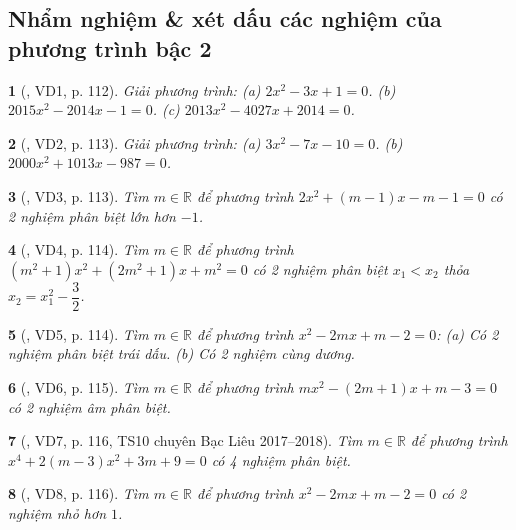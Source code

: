 \documentclass{article}
\newtheorem{baitoan}{}
\begin{document}
\subsection{Nhẩm nghiệm \& xét dấu các nghiệm của phương trình bậc 2}

\begin{baitoan}[\cite{Thu_Viet_Minh_ptb2}, VD1, p. 112]
	Giải phương trình: (a) $2x^2 - 3x + 1 = 0$. (b) $2015x^2 - 2014x - 1 = 0$. (c) $2013x^2 - 4027x + 2014 = 0$.
\end{baitoan}

\begin{baitoan}[\cite{Thu_Viet_Minh_ptb2}, VD2, p. 113]
	Giải phương trình: (a) $3x^2 - 7x - 10 = 0$. (b) $2000x^2 + 1013x - 987 = 0$.
\end{baitoan}

\begin{baitoan}[\cite{Thu_Viet_Minh_ptb2}, VD3, p. 113]
	Tìm $m\in\mathbb{R}$ để phương trình $2x^2 + (m - 1)x - m - 1 = 0$ có 2 nghiệm phân biệt lớn hơn $-1$.
\end{baitoan}

\begin{baitoan}[\cite{Thu_Viet_Minh_ptb2}, VD4, p. 114]
	Tìm $m\in\mathbb{R}$ để phương trình $(m^2 + 1)x^2 + (2m^2 + 1)x + m^2 = 0$ có 2 nghiệm phân biệt $x_1 < x_2$ thỏa $x_2 = x_1^2 - \dfrac{3}{2}$.
\end{baitoan}

\begin{baitoan}[\cite{Thu_Viet_Minh_ptb2}, VD5, p. 114]
	Tìm $m\in\mathbb{R}$ để phương trình $x^2 - 2mx + m - 2 = 0$: (a) Có 2 nghiệm phân biệt trái dấu. (b) Có 2 nghiệm cùng dương.
\end{baitoan}

\begin{baitoan}[\cite{Thu_Viet_Minh_ptb2}, VD6, p. 115]
	Tìm $m\in\mathbb{R}$ để phương trình $mx^2 - (2m + 1)x + m - 3 = 0$ có 2 nghiệm âm phân biệt.
\end{baitoan}

\begin{baitoan}[\cite{Thu_Viet_Minh_ptb2}, VD7, p. 116, TS10 chuyên Bạc Liêu 2017--2018]
	Tìm $m\in\mathbb{R}$ để phương trình $x^4 + 2(m - 3)x^2 + 3m + 9 = 0$ có 4 nghiệm phân biệt.
\end{baitoan}

\begin{baitoan}[\cite{Thu_Viet_Minh_ptb2}, VD8, p. 116]
	Tìm $m\in\mathbb{R}$ để phương trình $x^2 - 2mx + m - 2 = 0$ có 2 nghiệm nhỏ hơn $1$.
\end{baitoan}
\end{document}
